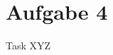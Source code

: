 
\section{Aufgabe 4}

\setcounter{exercise}{1}

\begin{frame}[allowframebreaks]{Task \thesection}{XYZ}
\end{frame}
